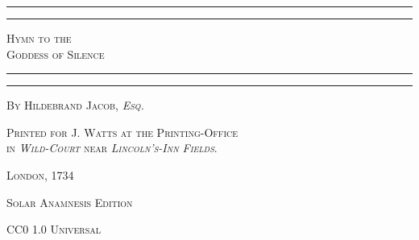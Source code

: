 \documentclass[a4paper, 11pt, oneside]{article}
\begin{document}
\begin{titlepage} %
	\centering %

	
	\rule{\textwidth}{1.6pt}\vspace*{-\baselineskip}\vspace*{2pt} %
	\rule{\textwidth}{0.4pt} %
	
	{\scshape\LARGE Hymn to the \\ Goddess of Silence}
	
	\rule{\textwidth}{0.4pt}\vspace*{-\baselineskip}\vspace{3.2pt} %
	\rule{\textwidth}{1.6pt} %

	
	\vspace{1\baselineskip}
	
	{\scshape By \Large Hildebrand Jacob, \emph{Esq.}} %
	





	
	


\vspace*{\fill}

	\vspace{1\baselineskip}

	{\footnotesize\scshape Printed for J. Watts at the Printing-Office \\ in \emph{Wild-Court} near \emph{Lincoln's-Inn Fields}.}
	
	{\small\scshape{London, 1734}}
	
	\vspace{0.5\baselineskip} %



\scshape Solar Anamnesis Edition
	
	{\scshape\small CC0 1.0 Universal} %
\end{titlepage}
\setlength{\parskip}{1mm plus1mm minus1mm}
\setcounter{tocdepth}{3}
\setcounter{secnumdepth}{3}
\clearpage
\end{document}
